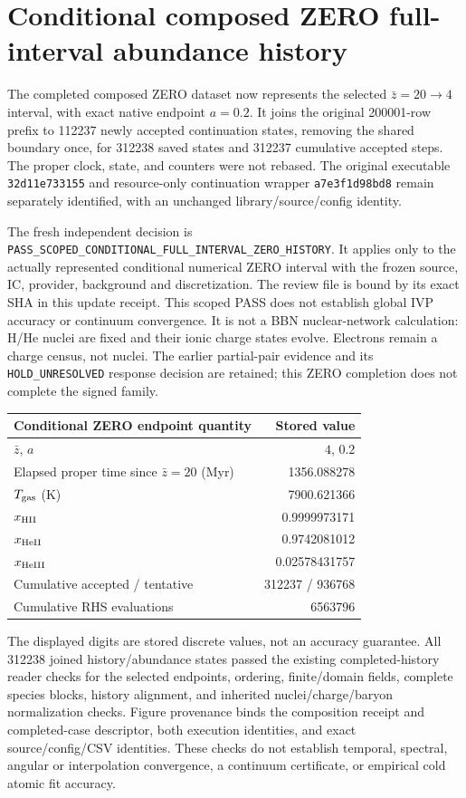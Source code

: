 \documentclass[11pt]{article}
\begin{document}
\clearpage
\section{Conditional composed ZERO full-interval abundance history}
The completed composed ZERO dataset now represents the selected $\bar z=20\to4$ interval, with exact native endpoint $a=0.2$. It joins the original 200001-row prefix to 112237 newly accepted continuation states, removing the shared boundary once, for 312238 saved states and 312237 cumulative accepted steps. The proper clock, state, and counters were not rebased. The original executable \texttt{32d11e733155} and resource-only continuation wrapper \texttt{a7e3f1d98bd8} remain separately identified, with an unchanged library/source/config identity.

The fresh independent decision is \texttt{PASS\_SCOPED\_CONDITIONAL\_FULL\_INTERVAL\_ZERO\_HISTORY}. It applies only to the actually represented conditional numerical ZERO interval with the frozen source, IC, provider, background and discretization. The review file is bound by its exact SHA in this update receipt. This scoped PASS does not establish global IVP accuracy or continuum convergence. It is not a BBN nuclear-network calculation: H/He nuclei are fixed and their ionic charge states evolve. Electrons remain a charge census, not nuclei. The earlier partial-pair evidence and its \texttt{HOLD\_UNRESOLVED} response decision are retained; this ZERO completion does not complete the signed family.

\begin{center}
\begin{tabular}{lr}\toprule
Conditional ZERO endpoint quantity & Stored value\\\midrule
$\bar z$, $a$ & $4$, $0.2$\\
Elapsed proper time since $\bar z=20$ (Myr) & 1356.088278\\
$T_{\rm gas}$ (K) & 7900.621366\\
$x_{\rm HII}$ & 0.9999973171\\
$x_{\rm HeII}$ & 0.9742081012\\
$x_{\rm HeIII}$ & 0.02578431757\\
Cumulative accepted / tentative & 312237 / 936768\\
Cumulative RHS evaluations & 6563796\\\bottomrule
\end{tabular}
\end{center}

The displayed digits are stored discrete values, not an accuracy guarantee. All 312238 joined history/abundance states passed the existing completed-history reader checks for the selected endpoints, ordering, finite/domain fields, complete species blocks, history alignment, and inherited nuclei/charge/baryon normalization checks. Figure provenance binds the composition receipt and completed-case descriptor, both execution identities, and exact source/config/CSV identities. These checks do not establish temporal, spectral, angular or interpolation convergence, a continuum certificate, or empirical cold atomic fit accuracy.
\end{document}
